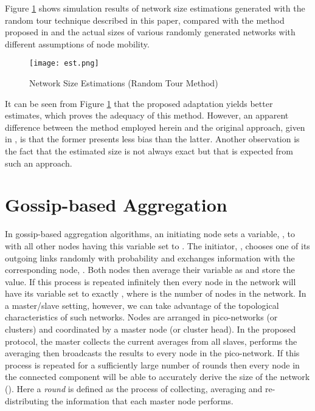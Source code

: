 \documentclass[twocolumn,10pt,conference]{IEEEtran}
\begin{document}
Figure \ref{random_tour} shows simulation results of network size estimations generated with the random tour technique described in this 
paper, compared with the method proposed in \cite{ref20} and the actual sizes of various randomly generated networks 
with different assumptions of node mobility. 
\begin{figure}[h!]
\begin{center}
\texttt{[image: est.png]}
\caption{Network Size Estimations (Random Tour Method)}
\label{random_tour}
\end{center}
\end{figure}

It can be seen from Figure \ref{random_tour} that the proposed adaptation yields better estimates, which 
proves the adequacy of this method. However, an apparent difference between the method employed herein and the original 
approach, given in \cite{ref20}, is that the former presents less bias than the latter. Another observation is the fact that 
the estimated size is not always exact but that is expected from such an approach.

\section{Gossip-based Aggregation}
In gossip-based aggregation algorithms, an initiating node sets a variable, , to  with all other nodes having this 
variable set to . The initiator, , chooses one of its outgoing links randomly with probability  and 
exchanges information with the corresponding node, . Both nodes then average their  variable as 
 and store the value. If this process is repeated infinitely then every node in the network 
will have its  variable set to exactly , where  is the number of nodes in the network.
In a master/slave setting, however, we can take advantage of the topological characteristics of such networks. Nodes are 
arranged in pico-networks (or clusters) and coordinated by a master node (or cluster head). In the proposed protocol,
the master collects the current averages from all slaves, performs the averaging then broadcasts the results to every node 
in the pico-network. If this process is repeated for a sufficiently large number of rounds then every node in the connected 
component will be able to accurately derive the size of the network (). Here a \textit{round} is defined as the process of 
collecting, averaging and re-distributing the information that each master node performs.  
\end{document}
